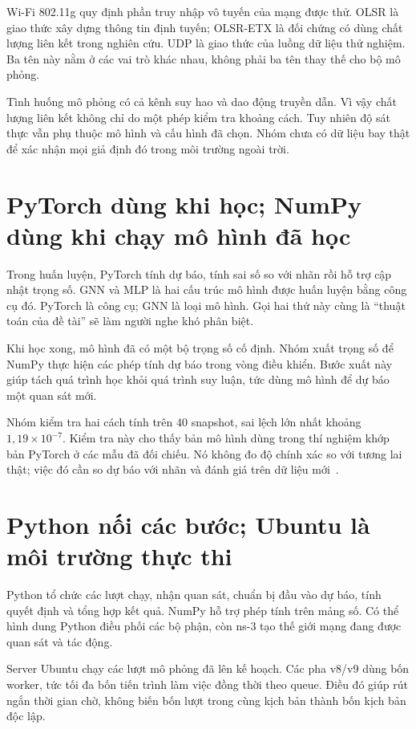 Wi-Fi 802.11g quy định phần truy nhập vô tuyến của mạng được thử. OLSR là giao thức xây dựng thông tin định tuyến; OLSR-ETX là đối chứng có dùng chất lượng liên kết trong nghiên cứu. UDP là giao thức của luồng dữ liệu thử nghiệm. Ba tên này nằm ở các vai trò khác nhau, không phải ba tên thay thế cho bộ mô phỏng.

Tình huống mô phỏng có cả kênh suy hao và dao động truyền dẫn. Vì vậy chất lượng liên kết không chỉ do một phép kiểm tra khoảng cách. Tuy nhiên độ sát thực vẫn phụ thuộc mô hình và cấu hình đã chọn. Nhóm chưa có dữ liệu bay thật để xác nhận mọi giả định đó trong môi trường ngoài trời.

\section{PyTorch dùng khi học; NumPy dùng khi chạy mô hình đã học}
Trong huấn luyện, PyTorch tính dự báo, tính sai số so với nhãn rồi hỗ trợ cập nhật trọng số. GNN và MLP là hai cấu trúc mô hình được huấn luyện bằng công cụ đó. PyTorch là công cụ; GNN là loại mô hình. Gọi hai thứ này cùng là ``thuật toán của đề tài'' sẽ làm người nghe khó phân biệt.

Khi học xong, mô hình đã có một bộ trọng số cố định. Nhóm xuất trọng số để NumPy thực hiện các phép tính dự báo trong vòng điều khiển. Bước xuất này giúp tách quá trình học khỏi quá trình suy luận, tức dùng mô hình để dự báo một quan sát mới.

Nhóm kiểm tra hai cách tính trên 40 snapshot, sai lệch lớn nhất khoảng $1,19\times10^{-7}$. Kiểm tra này cho thấy bản mô hình dùng trong thí nghiệm khớp bản PyTorch ở các mẫu đã đối chiếu. Nó không đo độ chính xác so với tương lai thật; việc đó cần so dự báo với nhãn và đánh giá trên dữ liệu mới~\cite{paper}.

\section{Python nối các bước; Ubuntu là môi trường thực thi}
Python tổ chức các lượt chạy, nhận quan sát, chuẩn bị đầu vào dự báo, tính quyết định và tổng hợp kết quả. NumPy hỗ trợ phép tính trên mảng số. Có thể hình dung Python điều phối các bộ phận, còn ns-3 tạo thế giới mạng đang được quan sát và tác động.

Server Ubuntu chạy các lượt mô phỏng đã lên kế hoạch. Các pha v8/v9 dùng bốn worker, tức tối đa bốn tiến trình làm việc đồng thời theo queue. Điều đó giúp rút ngắn thời gian chờ, không biến bốn lượt trong cùng kịch bản thành bốn kịch bản độc lập.

